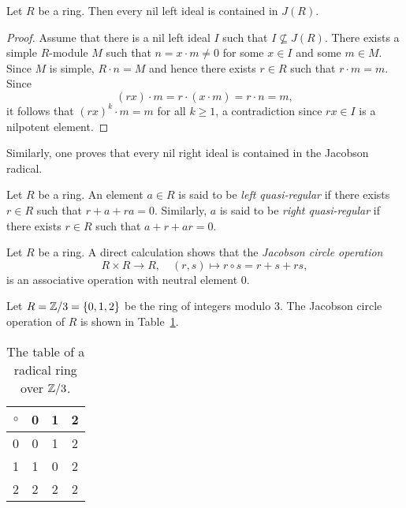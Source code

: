\begin{proposition}
	\label{pro:nilJ}
	Let $R$ be a ring. Then every nil left ideal is contained in $J(R)$.
\end{proposition}

\begin{proof}
	Assume that there is a nil left ideal $I$ such that 
	$I\not\subseteq J(R)$. There exists a simple $R$-module $M$ such that 
	$n=x\cdot m\ne 0$ for some $x\in I$ and some $m\in M$. Since $M$ is simple,
	$R\cdot n=M$ and hence there exists $r\in R$ such that $r\cdot m=m$. Since
	\[
	(rx)\cdot m=r\cdot (x\cdot m)=r\cdot n=m, 
	\]
	it follows that $(rx)^k\cdot m=m$ 
    for all 
	$k\geq1$, a contradiction since $rx\in I$ is a nilpotent element. 
\end{proof}

Similarly, one proves that 
every nil right ideal is contained in the Jacobson radical. 


\begin{definition}
Let $R$ be a ring. An element $a\in R$ is said to be 
\emph{left quasi-regular} if there exists $r\in R$ such that $r+a+ra=0$. Similarly, 
$a$ is said to be \emph{right quasi-regular} if there exists $r\in R$ such that $a+r+ar=0$. 
\end{definition}

Let $R$ be a ring. A direct calculation shows that
the \emph{Jacobson circle operation}
\[
R\times R\to R,
\quad
(r,s)\mapsto r\circ s=r+s+rs,
\]
is an associative operation with neutral element $0$.

\begin{example}
Let $R=\mathbb{Z}/3=\{0,1,2\}$ be the ring of integers modulo 3. 
The Jacobson circle 
operation of $R$ is shown in Table~\ref{tab:radical}.
\end{example}

	\begin{table}[bht]
  		\caption{The table of a radical ring over $\mathbb{Z}/3$.}
		\centering
		\begin{tabular}{c|ccc}
			$\circ$ & 0 & 1 & 2\tabularnewline
			\hline
			0 & 0 & 1 & 2\tabularnewline
			1 & 1 & 0 & 2\tabularnewline
			2 & 2 & 2 & 2\tabularnewline
		\end{tabular}
    \label{tab:radical}
 	\end{table}


